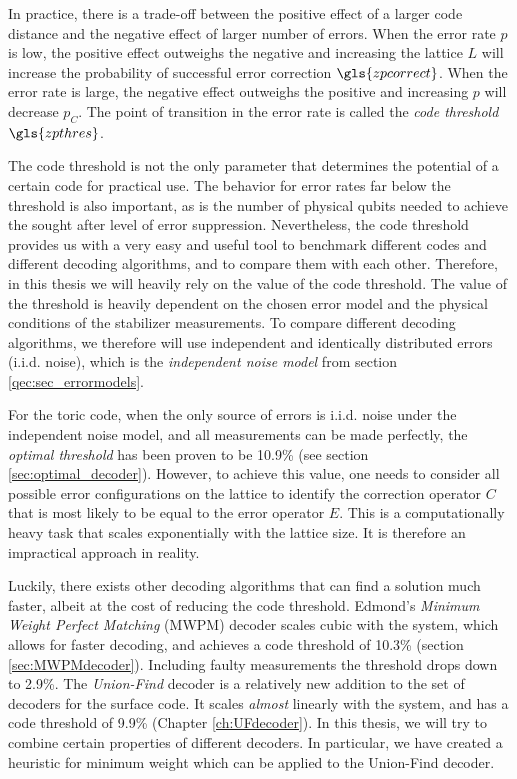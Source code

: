 In practice, there is a trade-off between the positive effect of a larger code distance and the negative effect of larger number of errors. When the error rate $p$ is low, the positive effect outweighs the negative and increasing the lattice $L$ will increase the probability of successful error correction $\gls{zpcorrect}$. When the error rate is large, the negative effect outweighs the positive and increasing $p$ will decrease $p_C$. The point of transition in the error rate is called the \emph{code threshold} $\gls{zpthres}$.

The code threshold is not the only parameter that determines the potential of a certain code for practical use. The behavior for error rates far below the threshold is also important, as is the number of physical qubits needed to achieve the sought after level of error suppression. Nevertheless, the code threshold provides us with a very easy and useful tool to benchmark different codes and different decoding algorithms, and to compare them with each other. Therefore, in this thesis we will heavily rely on the value of the code threshold. The value of the threshold is heavily dependent on the chosen error model and the physical conditions of the stabilizer measurements. To compare different decoding algorithms, we therefore will use independent and identically distributed errors (i.i.d. noise), which is the \emph{independent noise model} from section \ref{qec:sec_errormodels}.

For the toric code, when the only source of errors is i.i.d. noise under the independent noise model, and all measurements can be made perfectly, the \emph{optimal threshold} has been proven to be 10.9\% (see section \ref{sec:optimal_decoder}). However, to achieve this value, one needs to consider all possible error configurations on the lattice to identify the correction operator $C$ that is most likely to be equal to the error operator $E$. This is a computationally heavy task that scales exponentially with the lattice size. It is therefore an impractical approach in reality.

Luckily, there exists other decoding algorithms that can find a solution much faster, albeit at the cost of reducing the code threshold. Edmond's \emph{Minimum Weight Perfect Matching} (MWPM) decoder scales cubic with the system, which allows for faster decoding, and achieves a code threshold of 10.3\% (section \ref{sec:MWPMdecoder}). Including faulty measurements the threshold drops down to 2.9\%. The \emph{Union-Find} decoder is a relatively new addition to the set of decoders for the surface code. It scales \emph{almost} linearly with the system, and has a code threshold of 9.9\% (Chapter \ref{ch:UFdecoder}). In this thesis, we will try to combine certain properties of different decoders. In particular, we have created a heuristic for minimum weight which can be applied to the Union-Find decoder.


